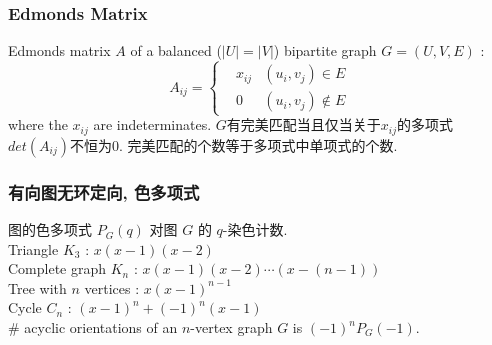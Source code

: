 	\subsubsection{Edmonds Matrix}
		Edmonds matrix $A$ of a balanced ($|U|=|V|$) bipartite graph $G=(U,V,E)$ : 
		\[A_{ij}=\left\{
			\begin{aligned}
				& x_{ij} & (u_i,v_j)\in E\\
				& 0 & (u_i,v_j)\notin E
			\end{aligned}
			\right.\]
		where the $x_{ij}$ are indeterminates. $G$有完美匹配当且仅当关于$x_{ij}$的多项式$det(A_{ij})$不恒为$0$.
		完美匹配的个数等于多项式中单项式的个数.
\subsubsection{有向图无环定向, 色多项式}
	\noindent
	图的色多项式 $P_G(q)$ 对图 $G$ 的 $q$-染色计数.\\
	Triangle $K_3$ : $x(x-1)(x-2)$\\
	Complete graph $K_n$ : $x(x-1)(x-2)\cdots (x-(n-1))$\\
	Tree with $n$ vertices : $x(x-1)^{n-1}$\\
	Cycle $C_n$ : $(x-1)^{n}+(-1)^{n}(x-1)$\\
	\# acyclic orientations of an $n$-vertex graph $G$ is $(-1)^nP_G(-1)$.
